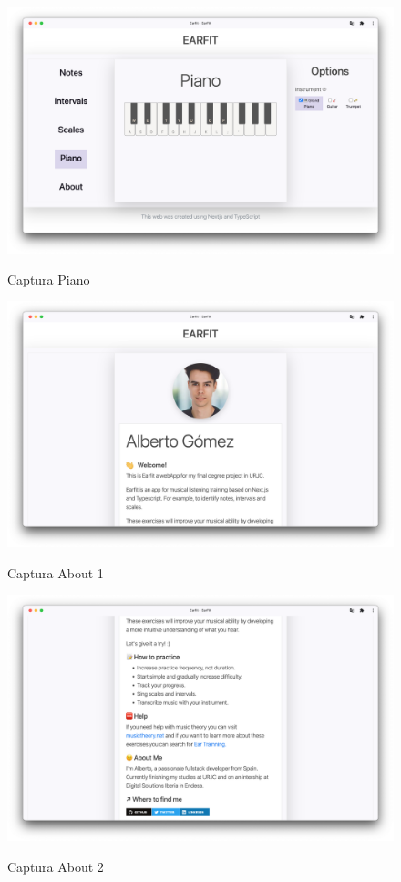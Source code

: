 \documentclass[12pt,twoside,titlepage]{report}
\begin{document}
{\begin{figure}[H]
    \centering
    \includegraphics[scale=0.28]{Capturas Earfit/PC/Piano}
    \label{fig:PCPiano}
    \caption{Captura Piano}
\end{figure}

\begin{figure}[H]
    \centering
    \includegraphics[scale=0.28]{Capturas Earfit/PC/About1}
    \label{fig:PCAbout1}
    \caption{Captura About 1}
\end{figure}

\begin{figure}[H]
    \centering
    \includegraphics[scale=0.28]{Capturas Earfit/PC/About2}
    \label{fig:PCAbout2}
    \caption{Captura About 2}
\end{figure}

}
\end{document}
